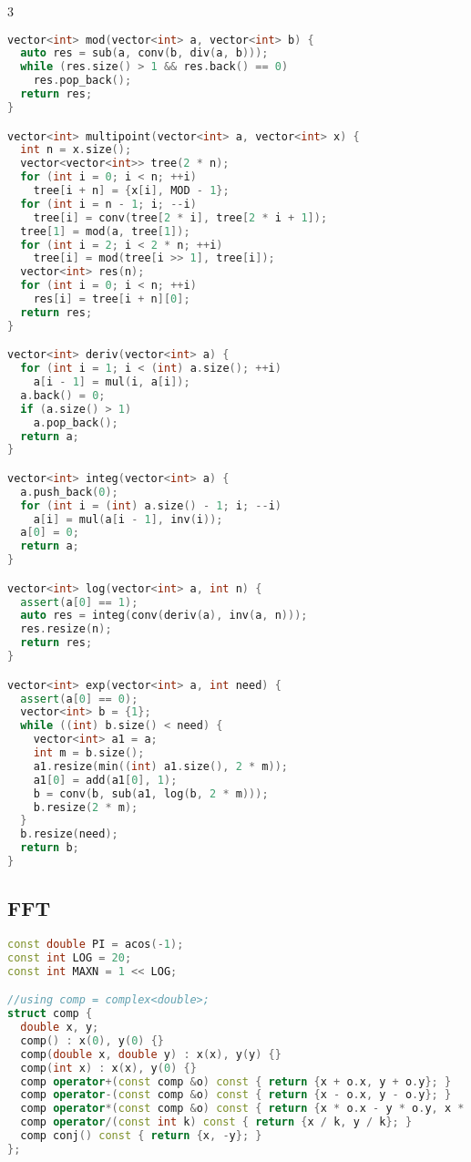\documentclass[9pt,a4paper,landscape,twosided]{extarticle}
\begin{document}
\begin{multicols*}{3}
\begin{lstlisting}[language=C++]
vector<int> mod(vector<int> a, vector<int> b) {
  auto res = sub(a, conv(b, div(a, b)));
  while (res.size() > 1 && res.back() == 0)
    res.pop_back();
  return res;
}

vector<int> multipoint(vector<int> a, vector<int> x) {
  int n = x.size();
  vector<vector<int>> tree(2 * n);
  for (int i = 0; i < n; ++i)
    tree[i + n] = {x[i], MOD - 1};
  for (int i = n - 1; i; --i)
    tree[i] = conv(tree[2 * i], tree[2 * i + 1]);
  tree[1] = mod(a, tree[1]);
  for (int i = 2; i < 2 * n; ++i)
    tree[i] = mod(tree[i >> 1], tree[i]);
  vector<int> res(n);
  for (int i = 0; i < n; ++i)
    res[i] = tree[i + n][0];
  return res;
}

vector<int> deriv(vector<int> a) {
  for (int i = 1; i < (int) a.size(); ++i)
    a[i - 1] = mul(i, a[i]);
  a.back() = 0;
  if (a.size() > 1)
    a.pop_back();
  return a;
}

vector<int> integ(vector<int> a) {
  a.push_back(0);
  for (int i = (int) a.size() - 1; i; --i)
    a[i] = mul(a[i - 1], inv(i));
  a[0] = 0;
  return a;
}

vector<int> log(vector<int> a, int n) {
  assert(a[0] == 1);
  auto res = integ(conv(deriv(a), inv(a, n)));
  res.resize(n);
  return res;
}

vector<int> exp(vector<int> a, int need) {
  assert(a[0] == 0);
  vector<int> b = {1};
  while ((int) b.size() < need) {
    vector<int> a1 = a;
    int m = b.size();
    a1.resize(min((int) a1.size(), 2 * m));
    a1[0] = add(a1[0], 1);
    b = conv(b, sub(a1, log(b, 2 * m)));
    b.resize(2 * m);
  }
  b.resize(need);
  return b;
}
\end{lstlisting}

\subsection{FFT}
\begin{lstlisting}[language=C++]
const double PI = acos(-1);
const int LOG = 20;
const int MAXN = 1 << LOG;

//using comp = complex<double>;
struct comp {
  double x, y;
  comp() : x(0), y(0) {}
  comp(double x, double y) : x(x), y(y) {}
  comp(int x) : x(x), y(0) {}
  comp operator+(const comp &o) const { return {x + o.x, y + o.y}; }
  comp operator-(const comp &o) const { return {x - o.x, y - o.y}; }
  comp operator*(const comp &o) const { return {x * o.x - y * o.y, x * o.y + y * o.x}; }
  comp operator/(const int k) const { return {x / k, y / k}; }
  comp conj() const { return {x, -y}; }
};


\end{lstlisting}
\end{multicols*}
\end{document}
